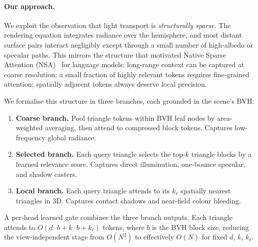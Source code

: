 \documentclass{egpubl}
\begin{document}
\paragraph{Our approach.}
We exploit the observation that light transport is \emph{structurally
sparse}.
The rendering equation integrates radiance over the hemisphere, and most
distant surface pairs interact negligibly except through a small number of
high-albedo or specular paths.
This mirrors the structure that motivated Native Sparse Attention
(NSA)~\cite{yuan2025nsa} for language models: long-range context can be
captured at coarse resolution; a small fraction of highly relevant tokens
requires fine-grained attention; spatially adjacent tokens always deserve
local precision.

We formalise this structure in three branches, each grounded in the scene's BVH:
\begin{enumerate}
  \item \textbf{Coarse branch.} Pool triangle tokens within BVH leaf nodes
    by area-weighted averaging, then attend to compressed block tokens.
    Captures low-frequency global radiance.
  \item \textbf{Selected branch.} Each query triangle selects the
    top-$k$ triangle blocks by a learned relevance score.
    Captures direct illumination, one-bounce specular, and shadow casters.
  \item \textbf{Local branch.} Each query triangle attends to its
    $k_\ell$ spatially nearest triangles in 3D.
    Captures contact shadows and near-field colour bleeding.
\end{enumerate}
A per-head learned gate combines the three branch outputs.
Each triangle attends to $O(d \cdot b + k \cdot b + k_\ell)$ tokens,
where $b$ is the BVH block size, reducing the view-independent stage
from $O(N^2)$ to effectively $O(N)$ for fixed $d$, $k$, $k_\ell$.
\end{document}
